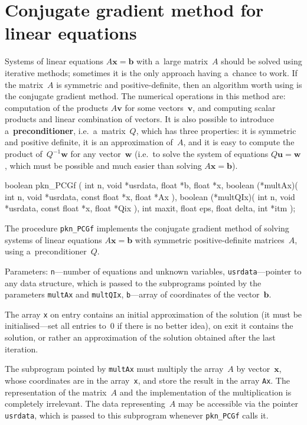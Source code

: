 \newpage
\section{\label{sect:pknum:PCG}Conjugate gradient method for linear equations}

Systems of linear equations $A\bm{x}=\bm{b}$ with a~large matrix~$A$ should
be solved using iterative methods; sometimes it is the only approach having
a~chance to work. If the matrix~$A$ is symmetric and positive-definite, then
an algorithm worth using is the conjugate gradient method. The numerical
operations in this method are: computation of the products $A\bm{v}$ for
some vectors~$\bm{v}$, and computing scalar products and linear combination of
vectors. It is also possible to introduce a~\textbf{preconditioner}, i.e.\
a~matrix~$Q$, which has three properties: it is symmetric and positive
definite, it is an approximation of~$A$, and it is easy to compute the
product of~$Q^{-1}\bm{w}$ for any vector~$\bm{w}$ (i.e.\ to solve the system of
equations $Q\bm{u}=\bm{w}$, which must be possible and much easier than solving
$A\bm{x}=\bm{b}$).

\medskip
\begin{listingC}
boolean pkn_PCGf ( int n, void *usrdata, float *b, float *x,
            boolean (*multAx)( int n, void *usrdata,
                               const float *x, float *Ax ),
            boolean (*multQIx)( int n, void *usrdata,
                                const float *x, float *Qix ),
            int maxit, float eps, float delta, int *itm );
\end{listingC}
The procedure \texttt{pkn\_PCGf} implements the conjugate gradient method of
solving systems of linear equations $A\bm{x}=\bm{b}$ with symmetric
positive-definite matrices~$A$, using a~preconditioner~$Q$.

Parameters: \texttt{n}---number of equations and unknown variables,
\texttt{usrdata}---pointer to any data structure, which is passed to the
subprograms pointed by the parameters \texttt{multAx} and \texttt{multQIx},
\texttt{b}---array of coordinates of the vector~$\bm{b}$.

The array \texttt{x} on entry contains an initial approximation of the
solution (it must be initialised---set all entries to~$0$ if there is no
better idea), on exit it contains the solution, or rather an approximation
of the solution obtained after the last iteration.

The subprogram pointed by \texttt{multAx} must multiply the array~$A$ by
vector~$\bm{x}$, whose coordinates are in the array~\texttt{x}, and store
the result in the array \texttt{Ax}. The representation of the matrix~$A$
and the implementation of the multiplication is completely irrelevant.
The data representing~$A$ may be accessible via the pointer
\texttt{usrdata}, which is passed to this subprogram whenever
\texttt{pkn\_PCGf} calls it.

